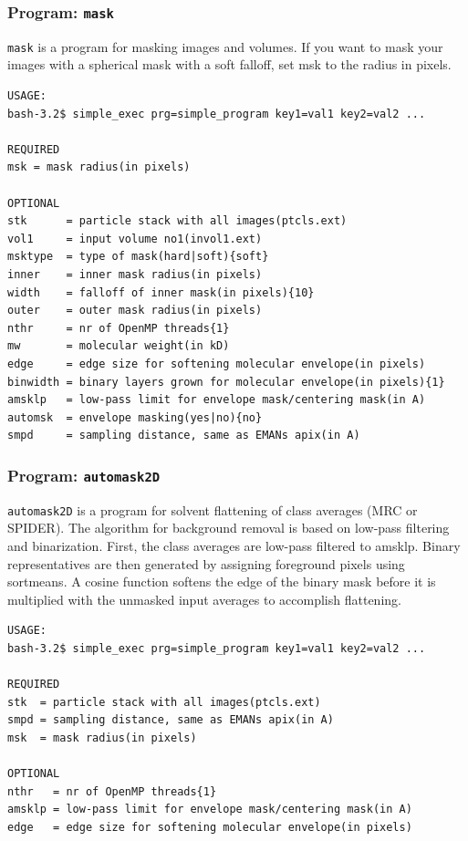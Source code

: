 \documentclass[a4paper,11pt]{article}
\newcommand{\prgname}[1]{\textcolor{NavyBlue}{\texttt{#1}}}
\begin{document}
\subsubsection{Program: \prgname{mask}}
\label{mask}
\prgname{mask} is a program for masking images and volumes. If you want to mask your images with a spherical mask with a soft falloff, set msk to the radius in pixels.

\begin{verbatim}
USAGE:
bash-3.2$ simple_exec prg=simple_program key1=val1 key2=val2 ...

REQUIRED
msk = mask radius(in pixels)

OPTIONAL
stk      = particle stack with all images(ptcls.ext)
vol1     = input volume no1(invol1.ext)
msktype  = type of mask(hard|soft){soft}
inner    = inner mask radius(in pixels)
width    = falloff of inner mask(in pixels){10}
outer    = outer mask radius(in pixels)
nthr     = nr of OpenMP threads{1}
mw       = molecular weight(in kD)
edge     = edge size for softening molecular envelope(in pixels)
binwidth = binary layers grown for molecular envelope(in pixels){1}
amsklp   = low-pass limit for envelope mask/centering mask(in A)
automsk  = envelope masking(yes|no){no}
smpd     = sampling distance, same as EMANs apix(in A)
\end{verbatim}

\subsubsection{Program: \prgname{automask2D}}
\label{automask2D}
\prgname{automask2D} is a program for solvent flattening of class averages (MRC or SPIDER). The algorithm for background removal is based on low-pass filtering and binarization. First, the class averages are low-pass filtered to amsklp. Binary representatives are then generated by assigning foreground pixels using sortmeans. A cosine function softens the edge of the binary mask before it is  multiplied with the unmasked input averages to accomplish flattening.

\begin{verbatim}
USAGE:
bash-3.2$ simple_exec prg=simple_program key1=val1 key2=val2 ...

REQUIRED
stk  = particle stack with all images(ptcls.ext)
smpd = sampling distance, same as EMANs apix(in A)
msk  = mask radius(in pixels)

OPTIONAL
nthr   = nr of OpenMP threads{1}
amsklp = low-pass limit for envelope mask/centering mask(in A)
edge   = edge size for softening molecular envelope(in pixels)
\end{verbatim}
\end{document}
